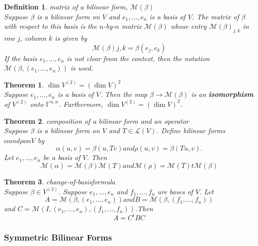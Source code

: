 \documentclass{article}
\newtheorem{theorem}{Theorem}[subsection]
\newtheorem{definition}{Definition}[subsection]
\newcommand{\FF}{\mathbb{F}}
\begin{document}
\begin{CJK}{UTF8}{gkai}
\begin{definition}
    matrix of a bilinear form, $\mathcal{M}(\beta)$\\
    
    Suppose $\beta$ is a bilinear form on $V$ and $e_1,\ldots,e_n$ is a basis of $V$. The matrix of $\beta$ with respect to this basis is the $n$-by-$n$ matrix $\mathcal{M}(\beta)$ whose entry $\mathcal{M}(\beta)_{j,k}$ in row $j$, column $k$ is given by
    \[\mathcal{M}(\beta)j,k = \beta(e_j,e_k)\]
    If the basis $e_1,\ldots,e_n$ is not clear from the context, then the notation $\mathcal{M}(\beta,(e_1,\ldots,e_n))$ is used.

\end{definition}

\begin{theorem}
    $\dim V^{(2)} = (\dim V)^2$\\

    Suppose $e_1,\ldots,e_n$ is a basis of $V$. Then the map $\beta \to \mathcal{M}(\beta)$ is an \textbf{isomorphism} of $V^{(2)}$ onto $\FF^{n,n}$. Furthermore, $\dim V^{(2)} = (\dim V)^2$.
\end{theorem}

\begin{theorem}
    composition of a bilinear form and an operator\\
    
    Suppose $\beta$ is a bilinear form on $V$ and $T \in \mathcal{L}(V)$. Define bilinear forms $\alpha and \rho on V$ by 
    \[\alpha(u,v) = \beta(u,Tv) and \rho(u,v) = \beta(Tu,v).\]
    Let $e_1,\ldots,e_n$ be a basis of $V$. Then
    \[\mathcal{M}(\alpha) = \mathcal{M}(\beta)\mathcal{M}(T) and \mathcal{M}(\rho)=\mathcal{M}(T)t\mathcal{M}(\beta)\]
\end{theorem}

\begin{theorem}
    change-of-basisformula\\

    Suppose $\beta\in V^{(2)}$. Suppose $e_1,\ldots,e_n$ and $f_1,\ldots, f_n$ are bases of $V$. Let
    \[A=\mathcal{M}(\beta,(e_1,\ldots,e_n)) and B=\mathcal{M}(\beta,(f_1,\ldots, f_n))\]
    and $C=\mathcal{M}(I,(e_1,\ldots,e_n),(f_1,\ldots, f_n))$.Then
    \[A=C^t B C\]
\end{theorem}

\subsubsection{Symmetric Bilinear Forms}


\end{CJK}
\end{document}
